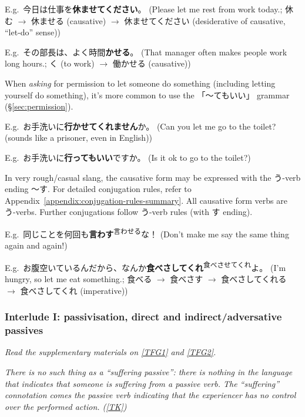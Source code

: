 \documentclass[../nihongo-gakushuu-kyouzai.tex]{subfiles}
\begin{document}
E.g.\ 今日は仕事を\textbf{休ませてください}。 (Please let me rest from work today.; 休む $\to$ 休ませる (causative) $\to$ 休ませてください (desiderative of causative, ``let-do'' sense))

E.g.\ その部長は、よく時間\textbf{かせる}。 (That manager often makes people work long hours.; く (to work) $\to$ 働かせる (causative))

When \emph{asking} for permission to let someone do something (including letting yourself do something), it's more common to use the 「〜てもいい」 grammar (\S\ref{sec:permission}).

E.g.\ お手洗いに\textbf{行かせてくれません}か。 (Can you let me go to the toilet? (sounds like a prisoner, even in English))

E.g.\ お手洗いに\textbf{行ってもいい}ですか。 (Is it ok to go to the toilet?)

In very rough/casual slang, the causative form may be expressed with the う-verb ending 〜す. For detailed conjugation rules, refer to Appendix~\ref{appendix:conjugation-rules-summary}. All causative form verbs are う-verbs. Further conjugations follow う-verb rules (with す ending).

E.g.\ 同じことを何回も\textbf{言わす}\textsuperscript{言わせる}な！ (Don't make me say the same thing again and again!)

E.g.\ お腹空いているんだから、なんか\textbf{食べさしてくれ}\textsuperscript{食べさせてくれ}よ。 (I'm hungry, so let me eat something.; 食べる $\to$ 食べさす $\to$ 食べさしてくれる $\to$ 食べさしてくれ (imperative))

\subsubsection{Interlude I: passivisation, direct and indirect/adversative passives} \label{sec:direct-and-indirect-adversative-passive}
\emph{Read the supplementary materials on \href{https://www.tofugu.com/japanese-grammar/verb-passive-form-rareru\#direct-vs-indirect-passive}{[TFG1]} and \href{https://www.tofugu.com/japanese-grammar/particle-ni/\#in-passive-sentences}{[TFG2]}.}

\emph{There is no such thing as a ``suffering passive'': there is nothing in the language that indicates that someone is suffering from a passive verb. The ``suffering'' connotation comes the passive verb indicating that the experiencer has no control over the performed action. (\href{https://www.guidetojapanese.org/blog/2005/09/09/no-suffering-passive/}{[TK]})}
\end{document}
